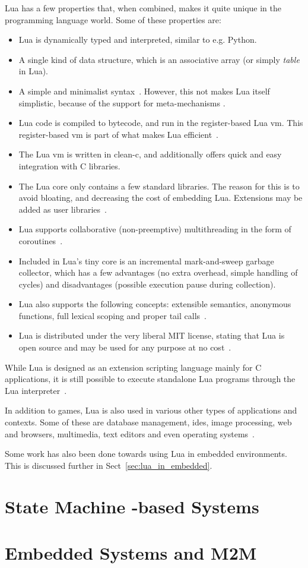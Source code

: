 Lua has a few properties that, when combined, makes it quite unique in the programming language world. Some of these properties are:
\begin{itemize}
	\item Lua is dynamically typed and interpreted, similar to e.g. Python.
	\item A single kind of data structure, which is an associative array (or simply \emph{table} in Lua).
	\item A simple and minimalist syntax~\cite[ch. 9]{manual:lua_reference_manual}. However, this not makes Lua itself simplistic, because of the support for meta-mechanisms \cite{manual:lua_reference_manual}.
	\item Lua code is compiled to bytecode, and run in the register-based Lua \gls{vm}. This register-based \gls{vm} is part of what makes Lua efficient~\cite{article:the_implementation_of_lua}.
	\item The Lua \gls{vm} is written in \gls{clean-c}, and additionally offers quick and easy integration with C libraries.
	\item The Lua core only contains a few standard libraries. The reason for this is to avoid bloating, and decreasing the cost of embedding Lua. Extensions may be added as user libraries~\cite{article:the_implementation_of_lua}.
	\item Lua supports collaborative (non-preemptive) multithreading in the form of coroutines~\cite[ch. 2.6]{manual:lua_reference_manual}.
	\item Included in Lua's tiny core is an incremental mark-and-sweep garbage collector, which has a few advantages (no extra overhead, simple handling of cycles) and disadvantages (possible execution pause during collection).
	\item Lua also supports the following concepts: extensible semantics, anonymous functions, full lexical scoping and proper tail calls~\cite{inproceedings:the_evolution_of_lua}.
	\item Lua is distributed under the very liberal MIT license, stating that Lua is open source and may be used for any purpose at no cost~\cite{website:lua_license}.
\end{itemize}

While Lua is designed as an extension scripting language mainly for C applications, it is still possible to execute standalone Lua programs through the Lua interpreter~\cite[ch. 7]{manual:lua_reference_manual}.

In addition to games, Lua is also used in various other types of applications and contexts. Some of these are database management, \glspl{ide}, image processing, web and browsers, multimedia, text editors and even operating systems~\cite{website:where_lua_is_used}.

Some work has also been done towards using Lua in embedded environments. This is discussed further in Sect~\ref{sec:lua_in_embedded}.

\section{State Machine -based Systems}
\label{sec:state_machine_system}


\section{Embedded Systems and M2M}
\label{sec:embedded_m2m}